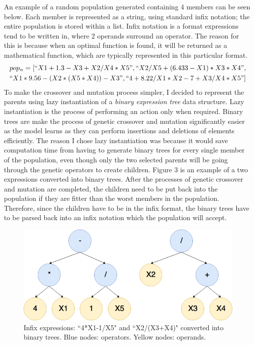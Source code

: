 \documentclass[11pt]{article}
\begin{document}
An example of a random population generated containing 4 members can be seen below. Each member is represented as a string, using standard infix notation; the entire population is stored within a list. Infix notation is a format expressions tend to be written in, where 2 operands surround an operator. The reason for this is because when an optimal function is found, it will be returned as a mathematical function, which are typically represented in this particular format. 
\begin{align*}
pop_n = [``X1+1.3-X3+X2/X4*X5" ,``X2/X5+(6.433-X1)*X3*X4", \\
``X1*9.56-(X2*(X5*X4))-X3", ``4+8.22/X1*X2-7+X3/X4*X5"] 
\end{align*}
To make the crossover and mutation process simpler, I decided to represent the parents using lazy instantiation of a \textit{binary expression tree} data structure. Lazy instantiation is the process of performing an action only when required. Binary trees are make the process of genetic crossover and mutation significantly easier as the model learns as they can perform insertions and deletions of elements efficiently. The reason I chose lazy instantiation was because it would save computation time from having to generate binary trees for every single member of the population, even though only the two selected parents will be going through the genetic operators to create children. Figure 3 is an example of a two expressions converted into binary trees. After the processes of genetic crossover and mutation are completed, the children need to be put back into the population if they are fitter than the worst members in the population. Therefore, since the children have to be in the infix format, the binary trees have to be parsed back into an infix notation which the population will accept. 
\begin{figure}[h]
\centering
\includegraphics[scale = .40]{binaryT}
\caption{Infix expressions: ``4*X1-1/X5" and ``X2/(X3+X4)" converted into binary trees. Blue nodes: operators. Yellow nodes: operands. } 
\end{figure}
\end{document}
